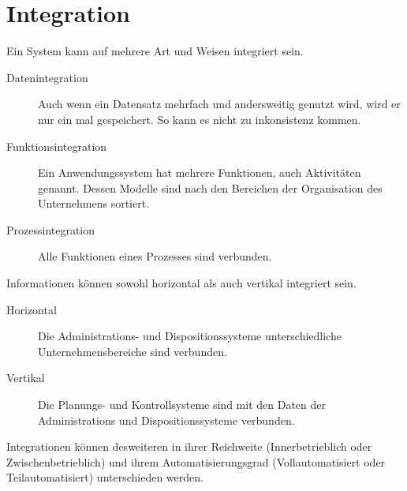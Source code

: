 \documentclass{article}
\begin{document}
\section{Integration}
Ein System kann auf mehrere Art und Weisen integriert sein.
\begin{description}
 \item[Datenintegration] Auch wenn ein Datensatz mehrfach und andersweitig genutzt wird, wird er nur ein mal gespeichert. So kann es nicht zu inkonsistenz kommen.
 \item[Funktionsintegration] Ein Anwendungssystem hat mehrere Funktionen, auch Aktivitäten genannt. Dessen Modelle sind \idr nach den Bereichen der Organisation des Unternehmens sortiert.
 \item[Prozessintegration] Alle Funktionen eines Prozesses sind verbunden.
\end{description}
Informationen können sowohl horizontal als auch vertikal integriert sein.
\begin{description}
 \item[Horizontal] Die Administrations- und Dispositionssysteme unterschiedliche Unternehmensbereiche sind verbunden.
 \item[Vertikal] Die Planungs- und Kontrollsysteme sind mit den Daten der Administrations und Dispositionssysteme verbunden.
\end{description}
Integrationen können desweiteren in ihrer Reichweite (Innerbetrieblich oder Zwischenbetrieblich) und ihrem Automatisierungsgrad (Vollautomatisiert oder Teilautomatisiert) unterschieden werden.
\end{document}

